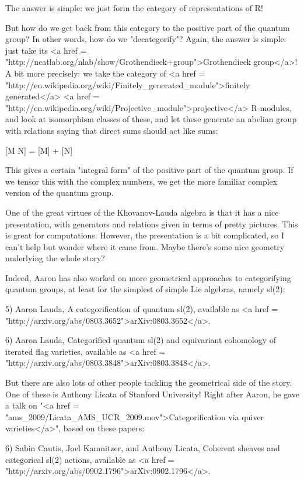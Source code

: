 The answer is simple: we just form the category of representations 
of R!

But how do we get back from this category to the positive part of the
quantum group?  In other words, how do we "decategorify"?
Again, the answer is simple: just take its <a href =
"http://ncatlab.org/nlab/show/Grothendieck+group">Grothendieck
group</a>!  A bit more precisely: we take the category of 
<a href = "http://en.wikipedia.org/wiki/Finitely_generated_module">finitely
generated</a> <a href =
"http://en.wikipedia.org/wiki/Projective_module">projective</a>
R-modules, and look at isomorphism classes of these, and let these
generate an abelian group with relations saying that direct sums
should act like sums:

[M \oplus  N] = [M] + [N]

This gives a certain "integral form" of the positive part of
the quantum group.  If we tensor this with the complex numbers, we get
the more familiar complex version of the quantum group.

One of the great virtues of the Khovanov-Lauda algebra is that it has
a nice presentation, with generators and relations given in terms of
pretty pictures.  This is great for computations.  However, the
presentation is a bit complicated, so I can't help but wonder where it
came from.  Maybe there's some nice geometry underlying the whole
story?  

Indeed, Aaron has also worked on more geometrical approaches to 
categorifying quantum groups, at least for the simplest of simple 
Lie algebras, namely sl(2):

5) Aaron Lauda, A categorification of quantum sl(2), available
as <a href = "http://arxiv.org/abs/0803.3652">arXiv:0803.3652</a>.
 
6) Aaron Lauda, Categorified quantum sl(2) and equivariant cohomology 
of iterated flag varieties, available as 
<a href = "http://arxiv.org/abs/0803.3848">arXiv:0803.3848</a>.

But there are also lots of other people tackling the geometrical side
of the story.  One of these is Anthony Licata of Stanford University!
Right after Aaron, he gave a talk on "<a href =
"ams_2009/Licata_AMS_UCR_2009.mov">Categorification via quiver
varieties</a>", based on these papers:

6) Sabin Cautis, Joel Kamnitzer, and Anthony Licata, Coherent
sheaves and categorical sl(2) actions, available as 
<a href = "http://arxiv.org/abs/0902.1796">arXiv:0902.1796</a>.

